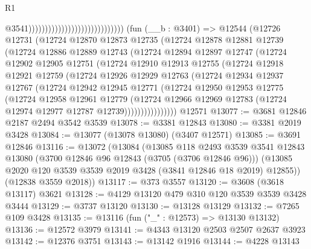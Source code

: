 \begin{lexlean}{R1}
\begin{coremodule}
                                                              @3541)))))))))))))))))))))))))))))
    (fun (__b : @3401) =>
    @12544
      (@12726
        @12731
        (@12724
          @12870
          @12873
          @12735
          (@12724
            @12878
            @12881
            @12739
            (@12724
              @12886
              @12889
              @12743
              (@12724
                @12894
                @12897
                @12747
                (@12724
                  @12902
                  @12905
                  @12751
                  (@12724
                    @12910
                    @12913
                    @12755
                    (@12724
                      @12918
                      @12921
                      @12759
                      (@12724
                        @12926
                        @12929
                        @12763
                        (@12724
                          @12934
                          @12937
                          @12767
                          (@12724
                            @12942
                            @12945
                            @12771
                            (@12724
                              @12950
                              @12953
                              @12775
                              (@12724
                                @12958
                                @12961
                                @12779
                                (@12724
                                  @12966
                                  @12969
                                  @12783
                                  (@12724 @12974 @12977 @12787 @12739))))))))))))))))
    @12571
@13077 := @3681 @12846 @2187 @2494 @3542 @3539
@13078 := @3381 @12843
@13080 := @3381 @2019 @3428
@13084 := @13077 (@13078 @13080) (@3407 @12571)
@13085 := @3691 @12846
@13116 := @13072
    (@13084
      (@13085
        @118
        @2493
        @3539
        @3541
        @12843
        @13080
        (@3700 @12846 @96 @12843 (@3705 (@3706 @12846 @96)))
        (@13085 @2020 @120 @3539 @3539 @2019 @3428 (@3841 @12846 @18 @2019) @12855))
      (@12838 @3559 @2018))
@13117 := @373 @3557
@13120 := @3608 (@3618 @13117) @3621
@13128 := @4129 @13120 @479 @310 @120 @3539 @3539 @3428 @3444
@13129 := @3737 @13120
@13130 := @13128 @13129
@13132 := @7265 @109 @3428
@13135 := @13116 (fun ("_" : @12573) => @13130 @13132)
@13136 := @12572 @3979
@13141 := @4343 @13120 @2503 @2507 @2637 @3923
@13142 := @12376 @3751
@13143 := @13142 @1916
@13144 := @4228 @13143

\end{coremodule}
\end{lexlean}
